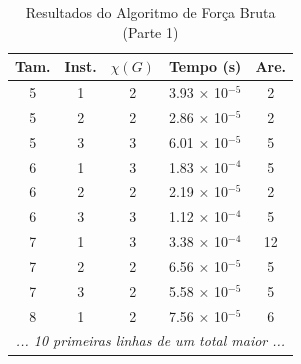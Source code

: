 \begin{table}[H]
\centering
\caption{Resultados do Algoritmo de Força Bruta (Parte 1)}
\label{tab:resultados_forca_bruta}
\begin{tabular}{ccccc}
\toprule
\textbf{Tam.} & \textbf{Inst.} & \textbf{$\chi(G)$} & \textbf{Tempo (s)} & \textbf{Are.} \\
\midrule
5 & 1 & 2 & 3.93 × 10$^{-5}$ & 2 \\
5 & 2 & 2 & 2.86 × 10$^{-5}$ & 2 \\
5 & 3 & 3 & 6.01 × 10$^{-5}$ & 5 \\
6 & 1 & 3 & 1.83 × 10$^{-4}$ & 5 \\
6 & 2 & 2 & 2.19 × 10$^{-5}$ & 2 \\
6 & 3 & 3 & 1.12 × 10$^{-4}$ & 5 \\
7 & 1 & 3 & 3.38 × 10$^{-4}$ & 12 \\
7 & 2 & 2 & 6.56 × 10$^{-5}$ & 5 \\
7 & 3 & 2 & 5.58 × 10$^{-5}$ & 5 \\
8 & 1 & 2 & 7.56 × 10$^{-5}$ & 6 \\
\multicolumn{5}{c}{\textit{... 10 primeiras linhas de um total maior ...}} \\
\bottomrule
\end{tabular}
\end{table}
